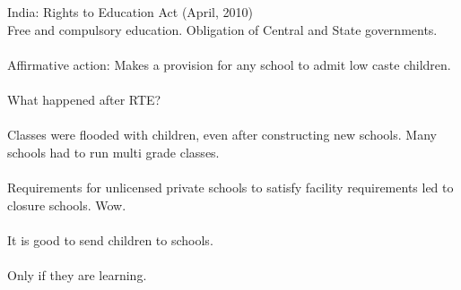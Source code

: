\begin{frame}{}
India: Rights to Education Act (April, 2010)\\
\pause
Free and compulsory education. Obligation of Central and State governments.\\~\\
\pause
Affirmative action: Makes a provision for any school to admit low caste children.\\~\\

\pause
What happened after RTE?\\~\\

\pause
Classes were flooded with children, even after constructing new schools. \pause Many schools had to run multi grade classes.\\~\\
\pause
Requirements for unlicensed private schools to satisfy facility requirements led to closure schools. Wow.\\~\\
\pause
It is good to send children to schools. \\~\\
\pause
Only if they are learning.
\end{frame}

